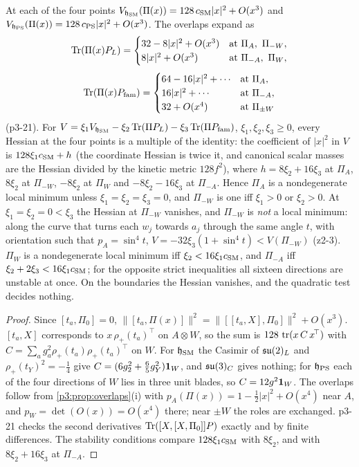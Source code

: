 \begin{proposition}
\label{p3:prop:hessian}
At each of the four points $V_{\mathfrak h_{\rm SM}}(\Pi(x))=128\,c_{\rm SM}|x|^2+O(x^3)$ and $V_{\mathfrak h_{\rm PS}}(\Pi(x))=128\,c_{\rm PS}|x|^2+O(x^3)$. The overlaps expand as
\[
\Tr(\Pi(x)P_L)=\begin{cases}32-8|x|^2+O(x^3)&\text{at }\Pi_A,\ \Pi_{-W},\\ 8|x|^2+O(x^3)&\text{at }\Pi_{-A},\ \Pi_W,\end{cases}
\]
\[
\operatorname{Tr}(\Pi(x)P_{\rm fam})=\begin{cases}64-16|x|^2+\cdots&\text{at }\Pi_A,\\ 16|x|^2+\cdots&\text{at }\Pi_{-A},\\ 32+O(x^4)&\text{at }\Pi_{\pm W}\end{cases}
\]
(p3-21). For $V=\xi_1 V_{\mathfrak h_{\rm SM}}-\xi_2\operatorname{Tr}(\Pi P_L)-\xi_3\operatorname{Tr}(\Pi P_{\rm fam})$, $\xi_1,\xi_2,\xi_3\ge0$, every Hessian at the four points is a multiple of the
identity: the coefficient of $|x|^2$ in $V$ is $128\xi_1 c_{\rm SM}+h$ (the coordinate Hessian is twice it, and canonical scalar masses are the Hessian divided by
the kinetic metric $128f^2$), where $h=8\xi_2+16\xi_3$ at $\Pi_A$, $8\xi_2$ at $\Pi_{-W}$, $-8\xi_2$ at $\Pi_W$ and $-8\xi_2-16\xi_3$ at $\Pi_{-A}$.
Hence $\Pi_A$ is a nondegenerate local minimum unless $\xi_1=\xi_2=\xi_3=0$, and $\Pi_{-W}$ is one iff $\xi_1>0$ or $\xi_2>0$. At $\xi_1=\xi_2=0<\xi_3$ the
Hessian at $\Pi_{-W}$ vanishes, and $\Pi_{-W}$ is \emph{not} a local minimum: along the curve that turns each $w_j$ towards $a_j$ through the same angle $t$, with
orientation such that $p_A=\sin^4t$, $V=-32\xi_3(1+\sin^4t)<V(\Pi_{-W})$ (z2-3). $\Pi_W$ is a nondegenerate local minimum iff $\xi_2<16\xi_1 c_{\rm SM}$, and $\Pi_{-A}$ iff
$\xi_2+2\xi_3<16\xi_1 c_{\rm SM}$; for the opposite strict inequalities all sixteen directions are unstable at once. On the boundaries the Hessian vanishes, and the
quadratic test decides nothing.
\end{proposition}

\begin{proof}
Since $[t_a,\Pi_0]=0$, $\|[t_a,\Pi(x)]\|^2=\|[[t_a,X],\Pi_0]\|^2+O(x^3)$. $[t_a,X]$ corresponds to $x\,\rho_+(t_a)^{\!\top}$ on $A\otimes W$, so the sum is
$128\,\operatorname{tr}(x\,C\,x^{\!\top})$ with $C=\sum_ag_a^2\rho_+(t_a)\rho_+(t_a)^{\!\top}$ on $W$. For $\mathfrak h_{\rm SM}$ the Casimir of $\mathfrak{su}(2)_L$ and $\rho_+(t_Y)^2=-\tfrac14$ give
$C=(6g_2^2+\tfrac65g_Y^2)\mathbf 1_W$, and $\mathfrak{su}(3)_C$ gives nothing; for $\mathfrak h_{\rm PS}$ each of the four directions of $W$ lies in three unit blades, so $C=12g^2\mathbf 1_W$. The
overlaps follow from \cref{p3:prop:overlaps}(i) with $p_A(\Pi(x))=1-\tfrac12|x|^2+O(x^4)$ near $A$, and $p_W=\det(O(x))=O(x^4)$ there; near $\pm W$ the roles are exchanged.
p3-21 checks the second derivatives $\operatorname{Tr}([X,[X,\Pi_0]]P)$ exactly and by finite differences. The stability conditions compare $128\xi_1 c_{\rm SM}$ with $8\xi_2$, and with
$8\xi_2+16\xi_3$ at $\Pi_{-A}$.
\end{proof}

